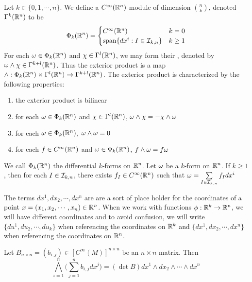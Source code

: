 \documentclass{book}
\begin{document}
	\begin{defn}
		Let $k \in \{0, 1, \cdots, n\}$. We define a $C^{\infty}(\mathbb{R}^n)$-module of dimension ${n \choose k}$, denoted $\Gamma^k(\mathbb{R}^n)$ to be 
		\[
		\Phi_k(\mathbb{R}^n) =
		\begin{cases}
			C^{\infty}(\mathbb{R}^n) & k = 0 \\
			\operatorname{span} \{ dx^i: I \in \mathcal{I}_{k,n} \} & k \geq 1
		\end{cases}
		\]
		For each $\omega \in \Phi_k(\mathbb{R}^n)$ and $\chi \in \Gamma^l(\mathbb{R}^n)$,   we may form their , denoted by $\omega \wedge \chi \in \Gamma^{k+l}(\mathbb{R}^n)$. Thus the exterior product is a map $\wedge : \Phi_k(\mathbb{R}^n) \times \Gamma^l(\mathbb{R}^n)\rightarrow \Gamma^{k+l}(\mathbb{R}^n)$. The exterior product is characterized by the following properties:
		\begin{enumerate}
			\item the exterior product is bilinear
			\item for each $\omega \in \Phi_k(\mathbb{R}^n)$ and $\chi \in \Gamma^l(\mathbb{R}^n)$, $\omega \wedge \chi = - \chi \wedge \omega$ 
			\item for each $\omega \in \Phi_k(\mathbb{R}^n)$, $\omega \wedge \omega = 0$
			\item for each $f \in C^{\infty}(\mathbb{R}^n)$ and $ \omega \in \Phi_k(\mathbb{R}^n)$, $f \wedge \omega = f \omega$
		\end{enumerate}
		We call $\Phi_k(\mathbb{R}^n)$ the differential $k$-forms on $\mathbb{R}^n$. Let $\omega$ be a $k$-form on $\mathbb{R}^n$. If $k \geq 1$, then for each $I \in \mathcal{I}_{k,n}$, there exists $f_I \in C^{\infty}(\mathbb{R}^n)$ such that $\omega = \sum\limits_{I \in \mathcal{I}_{k,n}} f_I dx^i$
	\end{defn}
	
	
	\begin{note}
		The terms $dx^1, dx_2, \cdots, dx^n$ are are a sort of place holder for the coordinates of a point $x = (x_1, x_2, \cdots, x_n) \in \mathbb{R}^n$. When we work with functions $\phi: \mathbb{R}^k \rightarrow \mathbb{R}^n$, we will have different coordinates and to avoid confusion, we will write $\{du^1, du_2, \cdots, du_k\}$ when referencing the coordinates on $\mathbb{R}^k$ and $\{dx^1, dx_2, \cdots, dx^n\}$ when referencing the coordinates on $\mathbb{R}^n$. 
	\end{note}

	\begin{ex}
		Let $B_{n\times n} = (b_{i,j}) \in [C^{\infty}(M)]^{n \times n}$ be an $n\times n$ matrix. Then $$\bigwedge_{i=1}^n \bigg(\sum_{j=1}^n b_{i,j}dx^j\bigg) = (\det B) dx^1 \wedge dx_2 \wedge \cdots \wedge dx^n$$
	\end{ex}
\end{document}
